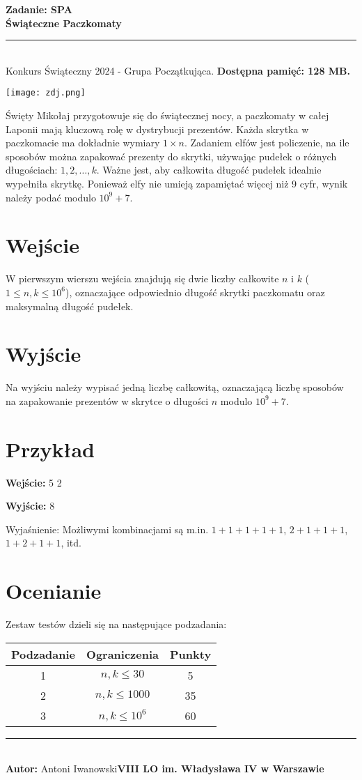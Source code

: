 \documentclass[a4paper,11pt]{article}
\newcommand{\tasktitle}{Świąteczne Paczkomaty}
\newcommand{\taskshort}{SPA}
\newcommand{\contestinfo}{Konkurs Świąteczny 2024 - Grupa Początkująca.}
\newcommand{\memorylimit}{128 MB}
\newcommand{\exampleinput}{5 2}
\newcommand{\exampleoutput}{8}
\newcommand{\explanation}{Możliwymi kombinacjami są m.in. $1+1+1+1+1$, $2+1+1+1$, $1+2+1+1$, itd.}
\newcommand{\authorinfo}{Antoni Iwanowski}
\newcommand{\schoolinfo}{VIII LO im. Władysława IV w Warszawie}
\newcommand{\subtasktable}{%
\begin{tabular}{|c|c|c|}
\hline
Podzadanie & Ograniczenia & Punkty \\
\hline
1 & $n, k \leq 30$ & 5 \\
2 & $n, k \leq 1000$ & 35 \\
3 & $n, k \leq 10^6$ & 60 \\
\hline
\end{tabular}}
\begin{document}
\noindent\textbf{\LARGE Zadanie: \taskshort} \\
\textbf{\Large \tasktitle} \\
\rule{\textwidth}{0.4pt} \\
\small \contestinfo \textbf{ Dostępna pamięć: \memorylimit.}

\begin{center}
\texttt{[image: zdj.png]} %
\end{center}

\noindent Święty Mikołaj przygotowuje się do świątecznej nocy, a paczkomaty w całej Laponii mają kluczową rolę w dystrybucji prezentów. Każda skrytka w paczkomacie ma dokładnie wymiary $1 \times n$. Zadaniem elfów jest policzenie, na ile sposobów można zapakować prezenty do skrytki, używając pudełek o różnych długościach: $1, 2, \dots, k$. Ważne jest, aby całkowita długość pudełek idealnie wypełniła skrytkę. Ponieważ elfy nie umieją zapamiętać więcej niż 9 cyfr, wynik należy podać modulo $10^9 + 7$.

\section*{Wejście}
W pierwszym wierszu wejścia znajdują się dwie liczby całkowite $n$ i $k$ ($1 \leq n, k \leq 10^6$), oznaczające odpowiednio długość skrytki paczkomatu oraz maksymalną długość pudełek.

\section*{Wyjście}
Na wyjściu należy wypisać jedną liczbę całkowitą, oznaczającą liczbę sposobów na zapakowanie prezentów w skrytce o długości $n$ modulo $10^9 + 7$. 

\section*{Przykład}
\begin{multicols}{2}
\noindent\textbf{Wejście:}
\exampleinput

\noindent\textbf{Wyjście:}
\exampleoutput
\end{multicols}

\noindent Wyjaśnienie: \explanation

\section*{Ocenianie}
Zestaw testów dzieli się na następujące podzadania:
\begin{center}
\subtasktable
\end{center}

\vspace{1cm}
\noindent \rule{\textwidth}{0.4pt} \\
\textbf{Autor:} \authorinfo  \hfill \textbf{\schoolinfo} \\
\end{document}
